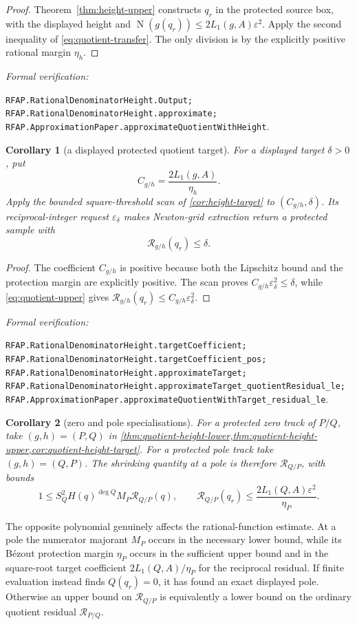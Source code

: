 \documentclass[11pt]{article}
\newtheorem{corollary}[corollary]{Corollary}
\newcommand{\Norm}[1]{\operatorname{N}\!\left(#1\right)}
\newcommand{\eps}{\varepsilon}
\newcommand{\leanref}[1]{\par\smallskip\noindent
  \emph{Formal verification:}\par\nobreak
  {\raggedright\nolinkurl{#1}.\par}}
\begin{document}
\begin{proof}
Theorem~\ref{thm:height-upper} constructs $q_r$ in the protected source box,
with the displayed height and
$\Norm{g(q_r)}\le2L_1(g,A)\eps^2$.  Apply the second inequality of
\eqref{eq:quotient-transfer}.  The only division is by the explicitly
positive rational margin $\eta_h$.
\end{proof}

\leanref{RFAP.RationalDenominatorHeight.Output;
RFAP.RationalDenominatorHeight.approximate;
RFAP.ApproximationPaper.approximateQuotientWithHeight}

\begin{corollary}[a displayed protected quotient target]
\label{cor:quotient-height-target}
For a displayed target $\delta>0$, put
\[
                  C_{g/h}=\frac{2L_1(g,A)}{\eta_h}.
\]
Apply the bounded square-threshold scan of
\cref{cor:height-target} to $(C_{g/h},\delta)$.  Its reciprocal-integer
request $\eps_\delta$ makes Newton-grid extraction return a protected sample
with
\[
                       \mathcal R_{g/h}(q_r)\le\delta.
\]
\end{corollary}

\begin{proof}
The coefficient $C_{g/h}$ is positive because both the Lipschitz bound and
the protection margin are explicitly positive.  The scan proves
$C_{g/h}\eps_\delta^2\le\delta$, while
\eqref{eq:quotient-upper} gives
$\mathcal R_{g/h}(q_r)\le C_{g/h}\eps_\delta^2$.
\end{proof}

\leanref{RFAP.RationalDenominatorHeight.targetCoefficient;
RFAP.RationalDenominatorHeight.targetCoefficient_pos;
RFAP.RationalDenominatorHeight.approximateTarget;
RFAP.RationalDenominatorHeight.approximateTarget_quotientResidual_le;
RFAP.ApproximationPaper.approximateQuotientWithTarget_residual_le}

\begin{corollary}[zero and pole specialisations]
\label{thm:quotient-height}
For a protected zero track of $P/Q$, take $(g,h)=(P,Q)$ in
\cref{thm:quotient-height-lower,thm:quotient-height-upper,cor:quotient-height-target}.
For a protected pole track take
$(g,h)=(Q,P)$.  The shrinking quantity at a pole is therefore
$\mathcal R_{Q/P}$, with bounds
\[
 1\le S_Q^2H(q)^{\deg Q}M_P\mathcal R_{Q/P}(q),
 \qquad
 \mathcal R_{Q/P}(q_r)
 \le\frac{2L_1(Q,A)\eps^2}{\eta_P}.
\]
\end{corollary}

The opposite polynomial genuinely affects the rational-function estimate.
At a pole the numerator majorant $M_P$ occurs in the necessary lower bound,
while its B\'ezout protection margin $\eta_P$ occurs in the sufficient upper
bound and in the square-root target coefficient
$2L_1(Q,A)/\eta_P$ for the reciprocal residual.  If finite evaluation instead
finds $Q(q_r)=0$, it has found an exact displayed pole.  Otherwise an upper
bound on $\mathcal R_{Q/P}$ is equivalently a lower bound on the ordinary
quotient residual $\mathcal R_{P/Q}$.
\end{document}
